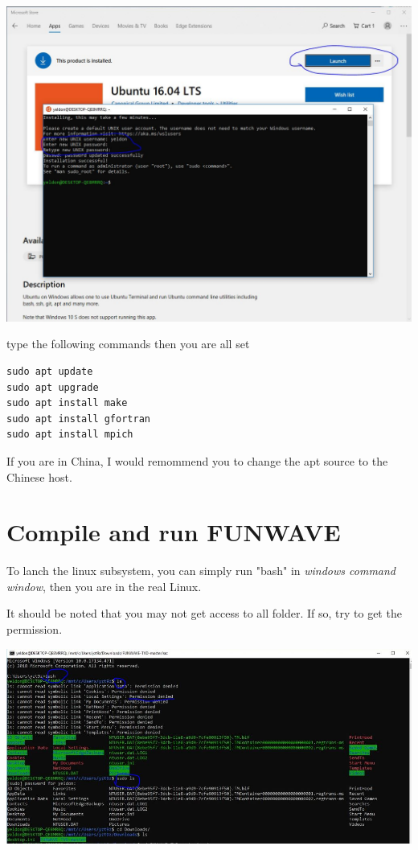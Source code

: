 \documentclass[11pt]{article}
\begin{document}
\begin{center}
\includegraphics[width=.9\linewidth]{./funwave_img/5.JPG}
\end{center}

type the following commands then you are all set


\begin{verbatim}
sudo apt update
sudo apt upgrade
sudo apt install make
sudo apt install gfortran
sudo apt install mpich
\end{verbatim}

If you are in China, I would remommend you to change the apt source to the
Chinese host. 

\section{Compile and run FUNWAVE}
\label{sec:org970342b}

To lanch the linux subsystem, you can simply run "bash" in \emph{windows command window}, then you are in the real Linux.

It should be noted that you may not get access to all folder. If so, try to get the permission.

\begin{center}
\includegraphics[width=.9\linewidth]{./funwave_img/7.JPG}
\end{center}
\end{document}
